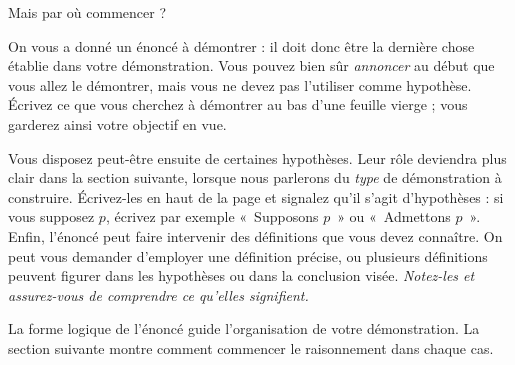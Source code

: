 \documentclass[../../../include/open-logic-section]{subfiles}
\begin{document}


Mais par où commencer ?

On vous a donné un énoncé à démontrer :
il doit donc être la dernière chose
établie dans votre démonstration.
Vous pouvez bien sûr \emph{annoncer}
au début que vous allez le démontrer,
mais vous ne devez pas l'utiliser
comme hypothèse. Écrivez ce que
vous cherchez à démontrer au bas
d'une feuille vierge ; vous garderez
ainsi votre objectif en vue.

Vous disposez peut-être ensuite
de certaines hypothèses. Leur rôle
deviendra plus clair dans la section
suivante, lorsque nous parlerons du
\emph{type} de démonstration à construire.
Écrivez-les en haut de la page et
signalez qu'il s'agit d'hypothèses :
si vous supposez $p$, écrivez par
exemple «~Supposons $p$~» ou
«~Admettons $p$~».
Enfin, l'énoncé peut faire intervenir
des définitions que vous devez
connaître. On peut vous demander
d'employer une définition précise,
ou plusieurs définitions peuvent
figurer dans les hypothèses ou
dans la conclusion visée.
\emph{Notez-les et assurez-vous
de comprendre ce qu'elles signifient.}

La forme logique de l'énoncé guide l'organisation de votre
démonstration. La section suivante montre comment commencer
le raisonnement dans chaque cas.
\end{document}
